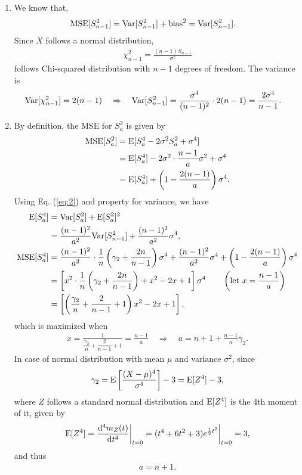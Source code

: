 \begin{enumerate}
	\item We know that,
	\begin{align*}
	\mathrm{MSE}[S_{n-1}^2] & = \mathrm{Var}[S_{n-1}^2] + \mathrm{bias}^2 = \mathrm{Var}[S_{n-1}^2].
	\end{align*}
	Since $X$ follows a normal distribution,
	\begin{align*}
	\chi_{n-1}^2 = \frac{(n-1)S_{n-1}}{\sigma^2}
	\end{align*}
	follows Chi-squared distribution with $n-1$ degrees of freedom. The variance is
	\begin{align*}
	\mathrm{Var}[\chi_{n-1}^2] = 2(n-1) \quad\Rightarrow\quad \mathrm{Var}[S_{n-1}^2] & = \frac{\sigma^4}{(n-1)^2}\cdot 2(n-1) = \frac{2\sigma^4}{n-1}.
	\end{align*}
	\item By definition, the MSE for $S_a^2$ is given by
	\begin{align*}
	\mathrm{MSE}[S_a^2] & = \mathrm{E}[S_a^4 - 2\sigma^2 S_a^2 + \sigma^4] \\
	& = \mathrm{E}[S_a^4] - 2\sigma^2 \cdot \frac{n-1}{a}\sigma^2 + \sigma^4 \\
	& = \mathrm{E}[S_a^4] + \left(1 - \frac{2(n-1)}{a} \right)\sigma^4.
	\end{align*}
	Using Eq. (\ref{eq:2}) and property for variance, we have
	\begin{align*}
	\mathrm{E}[S_a^4] & = \mathrm{Var}[S_a^2] + \mathrm{E}[S_a^2]^2 \\
	& = \frac{(n-1)^2}{a^2}\mathrm{Var}[S_{n-1}^2] + \frac{(n-1)^2}{a^2}\sigma^4, \\
	\mathrm{MSE}[S_a^4] & = \frac{(n-1)^2}{a^2}\cdot\frac{1}{n}\left(\gamma_2 + \frac{2n}{n-1} \right)\sigma^4 + \frac{(n-1)^2}{a^2}\sigma^4 + \left(1 - \frac{2(n-1)}{a} \right)\sigma^4 \\
	& = \left[x^2\cdot\frac{1}{n}\left(\gamma_2+\frac{2n}{n-1} \right) + x^2 - 2x + 1 \right]\sigma^4 \qquad \left(\mathrm{let\ } x = \frac{n-1}{a}\right) \\
	& = \left[\left(\frac{\gamma_2}{n} + \frac{2}{n-1} + 1\right)x^2 - 2x + 1 \right],
	\end{align*}
	which is maximized when
	\begin{align*}
	x = \frac{1}{\dfrac{\gamma_2}{n} + \dfrac{2}{n-1} + 1} = \frac{n-1}{a}\quad \Rightarrow\quad a = n + 1 + \frac{n-1}{n}\gamma_2.
	\end{align*}
	In case of normal distribution with mean $\mu$ and variance $\sigma^2$, since
	\begin{align*}
	\gamma_2 = \mathrm{E}\left[\frac{(X-\mu)^4}{\sigma^4} \right] - 3 = \mathrm{E}[Z^4] - 3,
	\end{align*}
	where $Z$ follows a standard normal distribution and $\mathrm{E}[Z^4]$ is the 4th moment of it, given by
	\begin{align*}
	\mathrm{E}[Z^4] = \frac{\mathrm{d}^4m_Z(t)}{\mathrm{d}t^4}\bigg|_{t=0} = (t^4 + 6t^2 + 3) e^{\frac{1}{2}t^2}\bigg|_{t=0} = 3,
	\end{align*}
	and thus
	\begin{align*}
	a = n + 1.
	\end{align*}
\end{enumerate}

